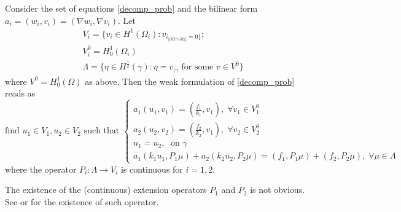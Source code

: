 \begin{proposition}
    Consider the set of equations \eqref{decomp_prob} and the bilinear form \(a_i = (w_i, v_i) = (\nabla w_i, \nabla v_i)\). Let
    \begin{align*}
        &V_i = \{v_i \in H^1(\Omega_i): v_{i_{|\partial \Omega \cap \partial {\Omega_i}}=0\}};\\
        &V_i^0 = H^1_0(\Omega_i)\\
        &\Lambda = \{\eta \in H^\frac{1}{2}(\gamma): \eta = v_{|\gamma} \text{ for some } v \in V^0\} 
    \end{align*}
    where \(V^0 = H^1_0(\Omega)\) as above.
    Then the weak formulation of \eqref{decomp_prob} reads as
    \begin{equation}\label{weak_decomp}
        \text{find } u_1\in V_1, u_2 \in V_2 \text{ such that }
        \begin{cases}
            a_1(u_1, v_1) = (\frac{f_1}{k_1}, v_1), \; \forall v_1 \in V_1^0\\
            a_2(u_2, v_2) = (\frac{f_2}{k_2}, v_1), \; \forall v_2 \in V_2^0\\
            u_1 = u_2, \; \text{ on } \gamma\\
            a_1(k_1 u_1, P_1 \mu) + a_2(k_2 u_2, P_2 \mu) = (f_1, P_1 \mu) + (f_2, P_2 \mu), \; \forall \mu \in \Lambda
        \end{cases}
    \end{equation}
    where the operator \(P_i: \Lambda \rightarrow V_i\) is continuous for \(i=1, 2\).
\end{proposition}

\begin{remark}
    The existence of the (continuous) extension operators \(P_1\) and \(P_2\) is not obvious. See \cite{adams2003sobolev} or \cite{lions2012non} for the existence of such operator. 
\end{remark}

